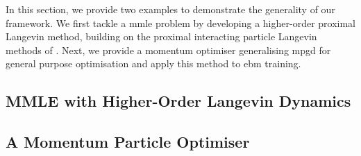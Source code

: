 In this section, we provide two examples to demonstrate the generality of our framework. We first tackle a \gls*{mmle} problem by developing a higher-order proximal Langevin method, building on the proximal interacting particle Langevin methods of \citet{encinar2025proximal}. Next, we provide a momentum optimiser generalising \gls*{mpgd} \citep{lim2024momentumparticlemaximumlikelihood} for general purpose optimisation and apply this method to \gls*{ebm} training.
\subsection{\textsc{\small MMLE} with Higher-Order Langevin Dynamics}\label{sec:mmle_image_deblurring}


\subsection{A Momentum Particle Optimiser}\label{sec:momentum_mfpo}
